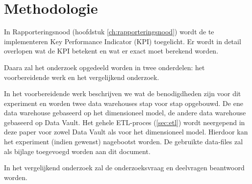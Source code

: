 
\chapter{Methodologie}
\label{ch:methodologie}

In Rapporteringsnood (hoofdstuk \ref{ch:rapporteringsnood}) wordt de te implementeren Key Performance Indicator (KPI) toegelicht. Er wordt in detail overlopen wat de KPI betekent en wat er exact moet berekend worden.

Daara zal het onderzoek opgedeeld worden in twee onderdelen: het voorbereidende werk en het vergelijkend onderzoek. 

In het voorbereidende werk beschrijven we wat de benodigdheden zijn voor dit experiment en worden twee data warehouses stap voor stap opgebouwd. De ene data warehouse gebaseerd op het dimensioneel model, de andere data warehouse gebaseerd op Data Vault. Het gehele ETL-proces (\ref{sec:etl}) wordt neergepend in deze paper voor zowel Data Vault als voor het dimensioneel model. Hierdoor kan het experiment (indien gewenst) nagebootst worden. De gebruikte data-files zal als bijlage toegevoegd worden aan dit document.

In het vergelijkend onderzoek zal de onderzoeksvraag en deelvragen beantwoord worden. 
